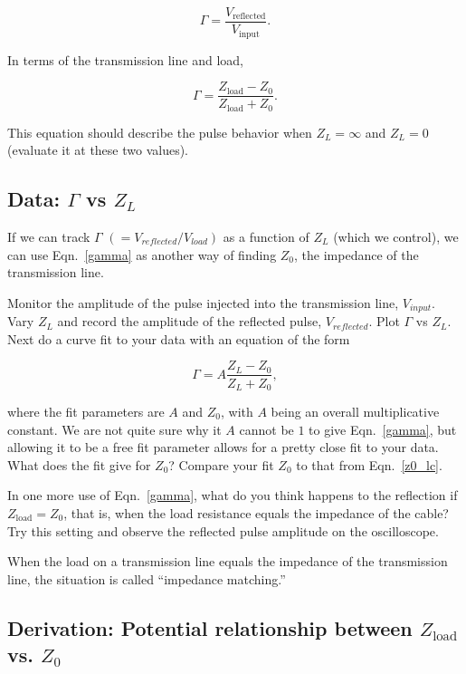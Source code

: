 \documentclass[12pt]{article}
\begin{document}
\begin{equation}
\Gamma=\frac{V_\text{reflected}}{V_\text{input}}.
\end{equation}

In terms of the transmission line and load,

\begin{equation}
\label{gamma}
\Gamma=\frac{Z_\text{load}-Z_0}{Z_\text{load}+Z_0}.
\end{equation}

This equation should describe the pulse behavior when $Z_L=\infty$ and $Z_L=0$ (evaluate it at these two values).


\subsection{Data: $\Gamma$ vs $Z_L$}

If we can track $\Gamma$ $(=V_{reflected}/V_{load})$ as a function of $Z_L$ (which we control), we can use Eqn.~\ref{gamma} as another way of finding $Z_0$, the impedance of the transmission line.


Monitor the amplitude of the pulse injected into the transmission line, $V_{input}$. Vary $Z_L$ and record the amplitude of the reflected pulse, $V_{reflected}$.  Plot $\Gamma$ vs $Z_L$. Next do a curve fit to your data with an equation of the form

\begin{equation}
\Gamma=A\frac{Z_L-Z_0}{Z_L+Z_0},
\end{equation}

where the fit parameters are $A$ and $Z_0$, with $A$ being an overall multiplicative constant. We are not quite sure why it $A$ cannot be $1$ to give Eqn.~\ref{gamma}, but allowing it to be a free fit parameter  allows for a pretty close fit to your data. What does the fit give for $Z_0$? Compare your fit $Z_0$ to that from Eqn.~\ref{z0_lc}.

In one more use of Eqn.~\ref{gamma}, what do you think happens to the reflection if $Z_\text{load}=Z_0$, that is, when the load resistance equals the impedance of the cable?  Try this setting and observe the reflected pulse amplitude on the oscilloscope.

When the load on a transmission line equals the impedance of the transmission line, the situation is called ``impedance matching.'' 

\subsection{Derivation: Potential relationship between $Z_\text{load}$ vs. $Z_0$}
\end{document}
